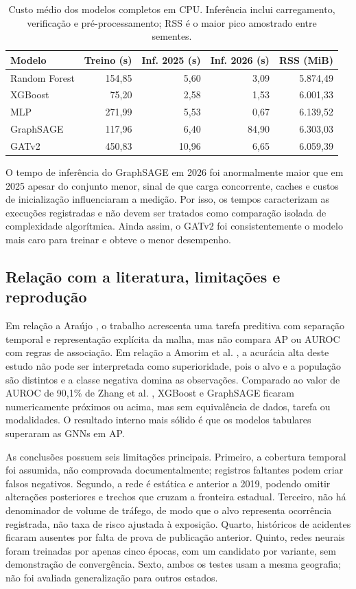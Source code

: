 \documentclass[12pt]{article}
\begin{document}
\begin{table}[htbp]
\centering
\caption{Custo médio dos modelos completos em CPU. Inferência inclui
carregamento, verificação e pré-processamento; RSS é o maior pico
amostrado entre sementes.}
\label{tab:custos}
\footnotesize
\setlength{\tabcolsep}{4pt}
\begin{tabular}{lrrrr}
\toprule
\textbf{Modelo} & \textbf{Treino (s)} & \textbf{Inf. 2025 (s)} &
\textbf{Inf. 2026 (s)} & \textbf{RSS (MiB)} \\
\midrule
Random Forest & 154,85 & 5,60 & 3,09 & 5.874,49 \\
XGBoost & 75,20 & 2,58 & 1,53 & 6.001,33 \\
MLP & 271,99 & 5,53 & 0,67 & 6.139,52 \\
GraphSAGE & 117,96 & 6,40 & 84,90 & 6.303,03 \\
GATv2 & 450,83 & 10,96 & 6,65 & 6.059,39 \\
\bottomrule
\end{tabular}
\end{table}

O tempo de inferência do GraphSAGE em 2026 foi anormalmente maior que
em 2025 apesar do conjunto menor, sinal de que carga concorrente,
caches e custos de inicialização influenciaram a medição. Por isso, os
tempos caracterizam as execuções registradas e não devem ser tratados
como comparação isolada de complexidade algorítmica. Ainda assim, o
GATv2 foi consistentemente o modelo mais caro para treinar e obteve o
menor desempenho.

\subsection{Relação com a literatura, limitações e reprodução}

Em relação a Araújo \cite{araujo2022}, o trabalho acrescenta uma tarefa
preditiva com separação temporal e representação explícita da malha,
mas não compara AP ou AUROC com regras de associação. Em relação a
Amorim et al. \cite{amorim2023}, a acurácia alta deste estudo não pode
ser interpretada como superioridade, pois o alvo e a população são
distintos e a classe negativa domina as observações. Comparado ao valor
de AUROC de 90,1\% de Zhang et al. \cite{zhang2026}, XGBoost e
GraphSAGE ficaram numericamente próximos ou acima, mas sem equivalência
de dados, tarefa ou modalidades. O resultado interno mais sólido é que
os modelos tabulares superaram as GNNs em AP.

As conclusões possuem seis limitações principais. Primeiro, a cobertura
temporal foi assumida, não comprovada documentalmente; registros
faltantes podem criar falsos negativos. Segundo, a rede é estática e
anterior a 2019, podendo omitir alterações posteriores e trechos que
cruzam a fronteira estadual. Terceiro, não há denominador de volume de
tráfego, de modo que o alvo representa ocorrência registrada, não taxa
de risco ajustada à exposição. Quarto, históricos de acidentes ficaram
ausentes por falta de prova de publicação anterior. Quinto, redes
neurais foram treinadas por apenas cinco épocas, com um candidato por
variante, sem demonstração de convergência. Sexto, ambos os testes usam
a mesma geografia; não foi avaliada generalização para outros estados.
\end{document}

